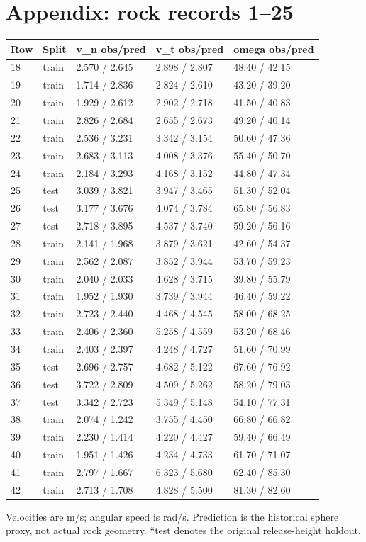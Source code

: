 \documentclass[10pt,a4paper]{article}
\begin{document}
\section*{Appendix: rock records 1--25}
\begin{center}\footnotesize\setlength{\tabcolsep}{4pt}
\begin{tabular}{lllll}
\hline
Row & Split & v\_n obs/pred & v\_t obs/pred & omega obs/pred\\\hline
18 & train & 2.570 / 2.645 & 2.898 / 2.807 & 48.40 / 42.15\\
19 & train & 1.714 / 2.836 & 2.824 / 2.610 & 43.20 / 39.20\\
20 & train & 1.929 / 2.612 & 2.902 / 2.718 & 41.50 / 40.83\\
21 & train & 2.826 / 2.684 & 2.655 / 2.673 & 49.20 / 40.14\\
22 & train & 2.536 / 3.231 & 3.342 / 3.154 & 50.60 / 47.36\\
23 & train & 2.683 / 3.113 & 4.008 / 3.376 & 55.40 / 50.70\\
24 & train & 2.184 / 3.293 & 4.168 / 3.152 & 44.80 / 47.34\\
25 & test & 3.039 / 3.821 & 3.947 / 3.465 & 51.30 / 52.04\\
26 & test & 3.177 / 3.676 & 4.074 / 3.784 & 65.80 / 56.83\\
27 & test & 2.718 / 3.895 & 4.537 / 3.740 & 59.20 / 56.16\\
28 & train & 2.141 / 1.968 & 3.879 / 3.621 & 42.60 / 54.37\\
29 & train & 2.562 / 2.087 & 3.852 / 3.944 & 53.70 / 59.23\\
30 & train & 2.040 / 2.033 & 4.628 / 3.715 & 39.80 / 55.79\\
31 & train & 1.952 / 1.930 & 3.739 / 3.944 & 46.40 / 59.22\\
32 & train & 2.723 / 2.440 & 4.468 / 4.545 & 58.00 / 68.25\\
33 & train & 2.406 / 2.360 & 5.258 / 4.559 & 53.20 / 68.46\\
34 & train & 2.403 / 2.397 & 4.248 / 4.727 & 51.60 / 70.99\\
35 & test & 2.696 / 2.757 & 4.682 / 5.122 & 67.60 / 76.92\\
36 & test & 3.722 / 2.809 & 4.509 / 5.262 & 58.20 / 79.03\\
37 & test & 3.342 / 2.723 & 5.349 / 5.148 & 54.10 / 77.31\\
38 & train & 2.074 / 1.242 & 3.755 / 4.450 & 66.80 / 66.82\\
39 & train & 2.230 / 1.414 & 4.220 / 4.427 & 59.40 / 66.49\\
40 & train & 1.951 / 1.426 & 4.234 / 4.733 & 61.70 / 71.07\\
41 & train & 2.797 / 1.667 & 6.323 / 5.680 & 62.40 / 85.30\\
42 & train & 2.713 / 1.708 & 4.828 / 5.500 & 81.30 / 82.60\\
\hline\end{tabular}\end{center}Velocities are m/s; angular speed is rad/s. Prediction is the historical sphere proxy, not actual rock geometry. ``test denotes the original release-height holdout.
\newpage
\end{document}
